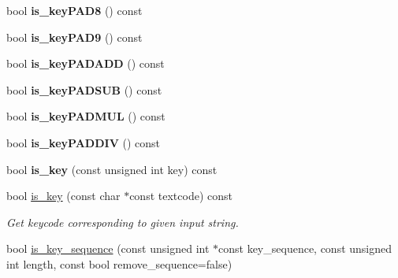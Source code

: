 \begin{DoxyCompactItemize}
\item 
\hypertarget{structcimg__library_1_1CImgDisplay_a796b4083380ef3d5a2e5d91497ef15e3}{
bool {\bfseries is\_\-keyPAD8} () const }
\label{structcimg__library_1_1CImgDisplay_a796b4083380ef3d5a2e5d91497ef15e3}

\item 
\hypertarget{structcimg__library_1_1CImgDisplay_abadbf1825a77489ee15d25710fec7974}{
bool {\bfseries is\_\-keyPAD9} () const }
\label{structcimg__library_1_1CImgDisplay_abadbf1825a77489ee15d25710fec7974}

\item 
\hypertarget{structcimg__library_1_1CImgDisplay_a07065df68fd795956e07dc3c1f60d963}{
bool {\bfseries is\_\-keyPADADD} () const }
\label{structcimg__library_1_1CImgDisplay_a07065df68fd795956e07dc3c1f60d963}

\item 
\hypertarget{structcimg__library_1_1CImgDisplay_a9f598d8794d2a29c10735d27dc3a4a53}{
bool {\bfseries is\_\-keyPADSUB} () const }
\label{structcimg__library_1_1CImgDisplay_a9f598d8794d2a29c10735d27dc3a4a53}

\item 
\hypertarget{structcimg__library_1_1CImgDisplay_ad9e06d61afb37b8f1ab0854be9549507}{
bool {\bfseries is\_\-keyPADMUL} () const }
\label{structcimg__library_1_1CImgDisplay_ad9e06d61afb37b8f1ab0854be9549507}

\item 
\hypertarget{structcimg__library_1_1CImgDisplay_afc7b98fea247d00464f539b6e9268d17}{
bool {\bfseries is\_\-keyPADDIV} () const }
\label{structcimg__library_1_1CImgDisplay_afc7b98fea247d00464f539b6e9268d17}

\item 
\hypertarget{structcimg__library_1_1CImgDisplay_a6c44d9820988689071b057256d16cbc1}{
bool {\bfseries is\_\-key} (const unsigned int key) const }
\label{structcimg__library_1_1CImgDisplay_a6c44d9820988689071b057256d16cbc1}

\item 
\hypertarget{structcimg__library_1_1CImgDisplay_ab8df75aaa8c32b86d2baedf281a70d0e}{
bool \hyperlink{structcimg__library_1_1CImgDisplay_ab8df75aaa8c32b86d2baedf281a70d0e}{is\_\-key} (const char $\ast$const textcode) const }
\label{structcimg__library_1_1CImgDisplay_ab8df75aaa8c32b86d2baedf281a70d0e}

\begin{DoxyCompactList}\small\item\em Get keycode corresponding to given input string. \item\end{DoxyCompactList}\item 
\hypertarget{structcimg__library_1_1CImgDisplay_ab4d07c4705f419b32b84dc91eaf4c564}{
bool \hyperlink{structcimg__library_1_1CImgDisplay_ab4d07c4705f419b32b84dc91eaf4c564}{is\_\-key\_\-sequence} (const unsigned int $\ast$const key\_\-sequence, const unsigned int length, const bool remove\_\-sequence=false)}
\label{structcimg__library_1_1CImgDisplay_ab4d07c4705f419b32b84dc91eaf4c564}


\end{DoxyCompactItemize}
